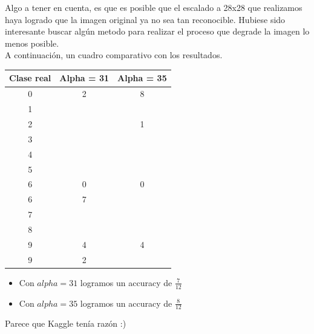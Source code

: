 Algo a tener en cuenta, es que es posible que el escalado a 28x28 que realizamos haya logrado que la imagen original ya no sea tan reconocible. Hubiese sido interesante buscar algún metodo para realizar el proceso que degrade la imagen lo menos posible. \\

A continuación, un cuadro comparativo con los resultados. \\


\begin{center}
    \begin{tabular}{| c | c | c |}
    \hline
     Clase real    & Alpha = 31  & Alpha = 35 \\  \hline
     0 &     2  & 8 \\ \hline
     1 & \color{blue}{1} & \color{blue}{1} \\ \hline
     2 & \color{blue}{2} & 1 \\ \hline
     3 & \color{blue}{3} & \color{blue}{3} \\ \hline
     4 & \color{blue}{4} & \color{blue}{4} \\ \hline
     5 & \color{blue}{5} & \color{blue}{5} \\ \hline
     6 & 0 & 0 \\ \hline
     6 & 7 & \color{blue}{6} \\ \hline
     7 & \color{blue}{7} & \color{blue}{7} \\ \hline
     8 & \color{blue}{8} & \color{blue}{8} \\ \hline
     9 & 4 & 4 \\ \hline
     9 & 2 & \color{blue}{9} \\ \hline
    \end{tabular}
\end{center}

\begin{itemize}
\item Con $alpha=31$ logramos un accuracy de $\frac{7}{12}$
\item Con $alpha=35$ logramos un accuracy de $\frac{8}{12}$
\end{itemize}

Parece que Kaggle tenía razón :) \\